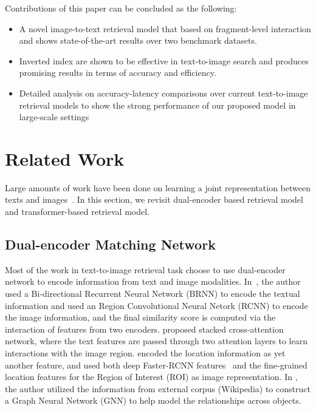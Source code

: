 \documentclass[11pt,a4paper]{article}
\begin{document}
Contributions of this paper can be concluded as the following:

\begin{itemize}
    \item A novel image-to-text retrieval model that based on fragment-level interaction and shows state-of-the-art results over two benchmark datasets. 
    \item  Inverted index are shown to be effective in text-to-image search and produces promising results in terms of accuracy and efficiency. 
    \item Detailed analysis on accuracy-latency comparisons over current text-to-image retrieval models to show the strong performance of our proposed model in large-scale settings
\end{itemize} 
\section{Related Work}
Large amounts of work have been done on learning a joint representation between texts and images~\cite{karpathy2015deep,huang2018learning,lee2018stacked,wehrmann2019language,li2020oscar,lu202012}. In this section, we revisit dual-encoder based retrieval model and transformer-based retrieval model.

\subsection{Dual-encoder Matching Network}
Most of the work in text-to-image retrieval task choose to use dual-encoder network to encode information from text and image modalities. In~\citet{karpathy2015deep}, the author used a Bi-directional Recurrent Neural Network (BRNN) to encode the textual information and used an Region Convolutional Neural Netork (RCNN) to encode the image information, and the final similarity score is computed via the interaction of features from two encoders. \citet{lee2018stacked} proposed stacked cross-attention network, where the text features are passed through two attention layers to learn interactions with the image region. \citet{wang2019position} encoded the location information as yet another feature, and used both deep Faster-RCNN features~\cite{ren2016faster} and the fine-grained location features for the Region of Interest (ROI) as image representation. In \citet{wang2020consensus}, the author utilized the information from external corpus (Wikipedia) to construct a Graph Neural Network (GNN) to help model the relationships across objects. 
\end{document}

